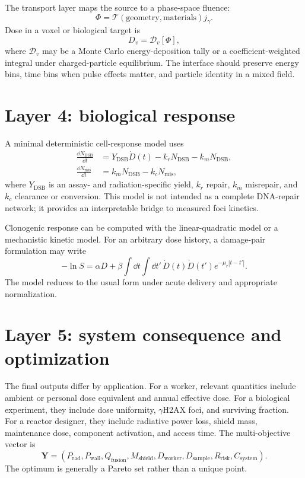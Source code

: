 The transport layer maps the source to a phase-space fluence:
\begin{equation}
\Phi=\mathcal{T}(\mathrm{geometry},\mathrm{materials})j_\gamma.
\end{equation}
Dose in a voxel or biological target is
\begin{equation}
D_v=\mathcal{D}_v[\Phi],
\end{equation}
where $\mathcal{D}_v$ may be a Monte Carlo energy-deposition tally or a coefficient-weighted integral under charged-particle equilibrium. The interface should preserve energy bins, time bins when pulse effects matter, and particle identity in a mixed field.

\section{Layer 4: biological response}

A minimal deterministic cell-response model uses
\begin{align}
\frac{\dd N_{\mathrm{DSB}}}{\dd t}
&=Y_{\mathrm{DSB}}\dot D(t)-k_rN_{\mathrm{DSB}}-k_mN_{\mathrm{DSB}},\\
\frac{\dd N_{\mathrm{mis}}}{\dd t}
&=k_mN_{\mathrm{DSB}}-k_cN_{\mathrm{mis}},
\end{align}
where $Y_{\mathrm{DSB}}$ is an assay- and radiation-specific yield, $k_r$ repair, $k_m$ misrepair, and $k_c$ clearance or conversion. This model is not intended as a complete DNA-repair network; it provides an interpretable bridge to measured foci kinetics.

Clonogenic response can be computed with the linear-quadratic model or a mechanistic kinetic model. For an arbitrary dose history, a damage-pair formulation may write
\begin{equation}
-\ln S
=\alpha D+\beta\int\!\dd t\int\!\dd t'\,
\dot D(t)\dot D(t')e^{-\mu_r|t-t'|}.
\label{eq:history-survival}
\end{equation}
The model reduces to the usual form under acute delivery and appropriate normalization.

\section{Layer 5: system consequence and optimization}

The final outputs differ by application. For a worker, relevant quantities include ambient or personal dose equivalent and annual effective dose. For a biological experiment, they include dose uniformity, $\gamma$H2AX foci, and surviving fraction. For a reactor designer, they include radiative power loss, shield mass, maintenance dose, component activation, and access time. The multi-objective vector is
\begin{equation}
\mathbf{Y}=
\left(P_{\mathrm{rad}},P_{\mathrm{wall}},Q_{\mathrm{fusion}},M_{\mathrm{shield}},D_{\mathrm{worker}},D_{\mathrm{sample}},R_{\mathrm{risk}},C_{\mathrm{system}}\right).
\end{equation}
The optimum is generally a Pareto set rather than a unique point.

